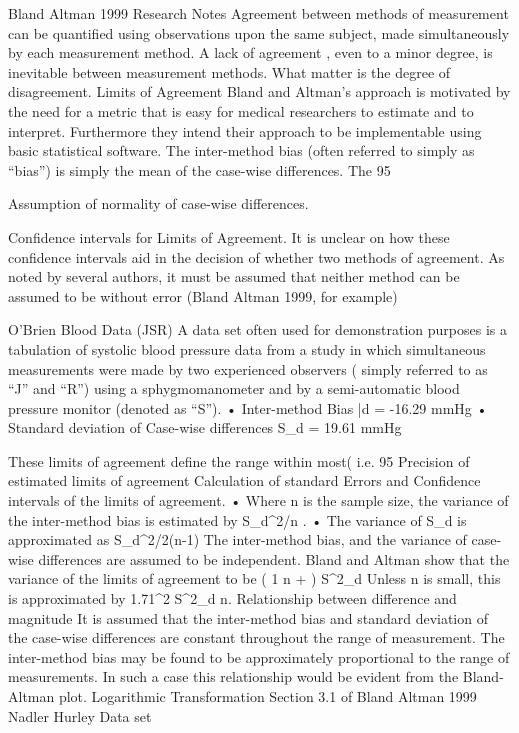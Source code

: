 Bland Altman 1999 Research Notes
Agreement between methods of measurement can be quantified using observations upon the same subject, made simultaneously  by each measurement method.
A lack of agreement , even to a minor degree, is inevitable between measurement methods. What matter is the degree of disagreement.
Limits of Agreement
Bland and Altman’s approach is motivated by the need for a metric that is easy for medical researchers to estimate and to interpret. Furthermore they intend their approach to be implementable using basic statistical software.
The inter-method bias (often referred to simply as “bias”) is simply the mean of the case-wise differences.
The 95%

Assumption of normality of case-wise differences.

Confidence intervals for Limits of Agreement.
It is unclear on how these confidence intervals aid in the decision of whether two methods of agreement.
As noted by several authors, it must be assumed that neither method can be assumed to be without error (Bland Altman 1999, for example)



O’Brien Blood Data (JSR)
A data set often used for demonstration purposes  is  a tabulation of systolic  blood pressure data from a study in which simultaneous measurements were made by two experienced observers ( simply referred to as “J” and “R”) using a sphygmomanometer and by a semi-automatic blood pressure monitor (denoted as “S”).
•	Inter-method Bias \bar{d} = -16.29 mmHg
•	Standard deviation of Case-wise differences  S_d = 19.61 mmHg

These limits of agreement define the range within most( i.e. 95%
Precision of estimated limits of agreement
Calculation of standard Errors and Confidence intervals of the limits of agreement.
•	Where n is the sample size, the variance of the inter-method bias is estimated by S_d^2/n .
•	The variance of S_d  is approximated as S_d^2/2(n-1)
The inter-method bias, and the variance of case-wise differences are assumed to be independent.
Bland and Altman show that the variance of the limits of agreement to be
\left( {1 \over n} +  \right) S^2_d
Unless n is small, this is approximated by 1.71^2 {S^2_d \over n}.
Relationship between difference and magnitude
It is assumed that the inter-method bias and standard deviation of the case-wise differences are constant throughout the range of measurement.
The inter-method bias may be found to be approximately proportional to the range of measurements. In such a case this relationship would be evident from the Bland-Altman plot.
Logarithmic Transformation
	Section 3.1 of Bland Altman 1999
	Nadler Hurley Data set


